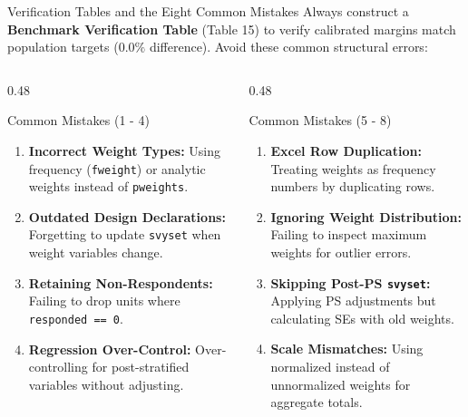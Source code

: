 \documentclass[10pt, aspectratio=169]{beamer}
\begin{document}
\begin{frame}{Verification Tables and the Eight Common Mistakes}
  Always construct a \textbf{Benchmark Verification Table} (Table 15) to verify calibrated margins match population targets ($0.0\%$ difference). Avoid these common structural errors:
  
  \begin{columns}[T]
    \begin{column}{0.48\textwidth}
      \begin{block}{Common Mistakes (1 - 4)}
        \begin{enumerate}
          \item \textbf{Incorrect Weight Types:} Using frequency (\texttt{fweight}) or analytic weights instead of \texttt{pweights}.
          \item \textbf{Outdated Design Declarations:} Forgetting to update \texttt{svyset} when weight variables change.
          \item \textbf{Retaining Non-Respondents:} Failing to drop units where \texttt{responded == 0}.
          \item \textbf{Regression Over-Control:} Over-controlling for post-stratified variables without adjusting.
        \end{enumerate}
      \end{block}
    \end{column}
    \begin{column}{0.48\textwidth}
      \begin{block}{Common Mistakes (5 - 8)}
        \begin{enumerate}
          \item \textbf{Excel Row Duplication:} Treating weights as frequency numbers by duplicating rows.
          \item \textbf{Ignoring Weight Distribution:} Failing to inspect maximum weights for outlier errors.
          \item \textbf{Skipping Post-PS \texttt{svyset}:} Applying PS adjustments but calculating SEs with old weights.
          \item \textbf{Scale Mismatches:} Using normalized instead of unnormalized weights for aggregate totals.
        \end{enumerate}
      \end{block}
    \end{column}
  \end{columns}
\end{frame}
\end{document}
